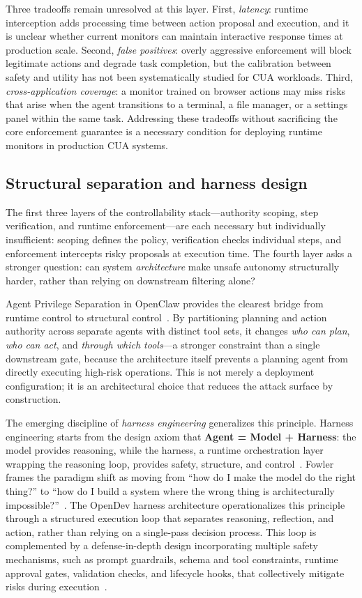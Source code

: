 Three tradeoffs remain unresolved at this layer. First, \emph{latency}: runtime interception adds processing time between action proposal and execution, and it is unclear whether current monitors can maintain interactive response times at production scale. Second, \emph{false positives}: overly aggressive enforcement will block legitimate actions and degrade task completion, but the calibration between safety and utility has not been systematically studied for CUA workloads. Third, \emph{cross-application coverage}: a monitor trained on browser actions may miss risks that arise when the agent transitions to a terminal, a file manager, or a settings panel within the same task. Addressing these tradeoffs without sacrificing the core enforcement guarantee is a necessary condition for deploying runtime monitors in production CUA systems.

\subsection{Structural separation and harness design}

The first three layers of the controllability stack---authority scoping, step verification, and runtime enforcement---are each necessary but individually insufficient: scoping defines the policy, verification checks individual steps, and enforcement intercepts risky proposals at execution time. The fourth layer asks a stronger question: can system \emph{architecture} make unsafe autonomy structurally harder, rather than relying on downstream filtering alone?

Agent Privilege Separation in OpenClaw provides the clearest bridge from runtime control to structural control~\cite{agentprivsep2026}. By partitioning planning and action authority across separate agents with distinct tool sets, it changes \emph{who can plan}, \emph{who can act}, and \emph{through which tools}---a stronger constraint than a single downstream gate, because the architecture itself prevents a planning agent from directly executing high-risk operations. This is not merely a deployment configuration; it is an architectural choice that reduces the attack surface by construction.

The emerging discipline of \emph{harness engineering} generalizes this principle. Harness engineering starts from the design axiom that \textbf{Agent = Model + Harness}: the model provides reasoning, while the harness, a runtime orchestration layer wrapping the reasoning loop, provides safety, structure, and control~\cite{harnessEngFowler2025,opendevHarness2026}. Fowler frames the paradigm shift as moving from ``how do I make the model do the right thing?'' to ``how do I build a system where the wrong thing is architecturally impossible?''~\cite{harnessEngFowler2025}. The OpenDev harness architecture operationalizes this principle through a structured execution loop that separates reasoning, reflection, and action, rather than relying on a single-pass decision process. This loop is complemented by a defense-in-depth design incorporating multiple safety mechanisms, such as prompt guardrails, schema and tool constraints, runtime approval gates, validation checks, and lifecycle hooks, that collectively mitigate risks during execution~\cite{opendevHarness2026}.

